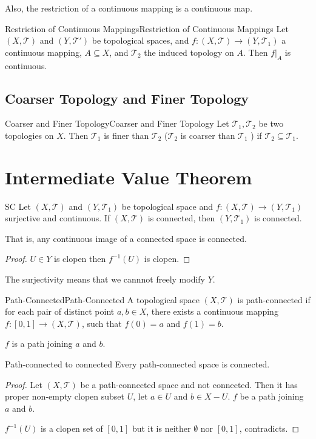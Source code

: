 \documentclass[../main.tex]{subfiles}
\begin{document}
Also, the restriction of a continuous mapping is a continuous map.
\begin{proposition}{Restriction of Continuous Mappings}{Restriction of Continuous Mappings}
Let $(X,\mathcal{T})$ and $(Y,\mathcal{T}')$ be topological spaces, and $f:(X,\mathcal{T})\rightarrow (Y,\mathcal{T}_1)$ a continuous mapping, $A \subseteq X$, and $\mathcal{T}_2$ the induced topology on $A$. Then $f|_A$ is continuous.
\end{proposition}

\subsection{Coarser Topology and Finer Topology}
\begin{definition}{Coarser and Finer Topology}{Coarser and Finer Topology}
Let $\mathcal{T}_1, \mathcal{T}_2$ be two topologies on $X$. Then $\mathcal{T}_1$ is finer than $\mathcal{T}_2$ ($\mathcal{T}_2$ is coarser than $\mathcal{T}_1$ ) if $\mathcal{T}_2 \subseteq \mathcal{T}_1$.
\end{definition}


\section{Intermediate Value Theorem}
\begin{proposition}{}{SC}
Let $(X,\mathcal{T})$ and $(Y,\mathcal{T}_1)$ be topological space and $f: (X,\mathcal{T})\rightarrow (Y,\mathcal{T}_1)$ surjective and continuous. If $(X,\mathcal{T})$ is connected, then $(Y,\mathcal{T}_1)$ is connected.

That is, any continuous image of a connected space is connected.
\end{proposition}
\begin{proof}
$U\in Y$ is clopen then $f^{-1}(U)$ is clopen.
\end{proof}
\begin{remark}
The surjectivity means that we cannnot freely modify $Y$.
\end{remark}

\begin{definition}{Path-Connected}{Path-Connected}
	A topological space $(X,\mathcal{T})$ is path-connected if for each pair of distinct point $a,b\in X$, there exists a continuous mapping $f:[0,1]\rightarrow (X,\mathcal{T})$, such that $f(0)=a$ and $f(1)=b$.

	$f$ is a path joining $a$ and $b$.
\end{definition}
\begin{proposition}{}{Path-connected to connected}
Every path-connected space is connected.
\end{proposition}
\begin{proof}
Let $(X,\mathcal{T})$ be a path-connected space and not connected. Then it has proper non-empty clopen subset $U$, let $a\in U$ and $b\in X-U$. $f$ be a path joining $a$ and $b$.

$f^{-1}(U)$ is a clopen set of $[0,1]$ but it is neither $\emptyset $ nor $[0,1]$, contradicts.
\end{proof}
\end{document}
